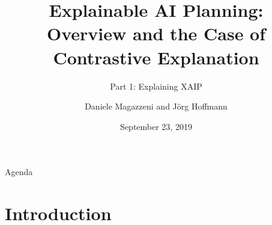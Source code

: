 \title[Explainable AI Planning]{Explainable AI Planning:\\ Overview and the Case of Contrastive Explanation}

\subtitle{Part 1: Explaining XAIP}

\author[Magazzeni and Hoffmann]{Daniele Magazzeni and J\"org Hoffmann}


\date{September 23, 2019}





\frame{\titlepage}

\begin{frame}{Agenda}
\tableofcontents
\end{frame}



%

\section[Introduction]{Introduction}
\subsection*{}

\begin{frame}{}

\end{frame}


